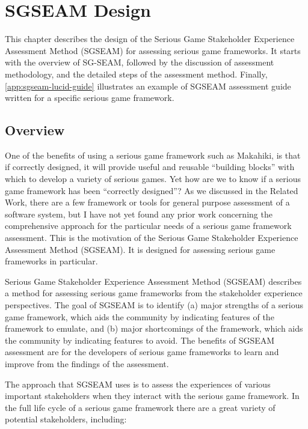 \chapter{SGSEAM Design}
\label{cha:sgseam-design}

This chapter describes the design of the Serious Game Stakeholder Experience 
Assessment Method (SGSEAM) for assessing serious game frameworks. It starts with the overview of SG-SEAM, followed by the discussion of assessment methodology, and the detailed steps of the assessment method. Finally, \autoref {app:sgseam-lucid-guide} illustrates an example of SGSEAM assessment guide written for a specific serious game framework.

\section{Overview}

One of the benefits of using a serious game framework such as Makahiki, is that if correctly designed, it will provide useful and reusable ``building blocks'' with which to develop a variety of serious games. Yet how are we to know if a serious game framework has been ``correctly designed''? As we discussed in the Related Work, there are a few  framework or tools for general purpose assessment of a software system, but I have not yet found any prior work concerning the comprehensive approach for the particular needs of a serious game framework assessment. This is the motivation of the Serious Game Stakeholder Experience 
Assessment Method (SGSEAM). It is designed for assessing serious game frameworks in particular.

Serious Game Stakeholder Experience Assessment Method (SGSEAM) describes a method for 
assessing serious game frameworks from the stakeholder 
experience perspectives.  The goal of SGSEAM is to identify (a) major strengths of a serious game
framework, which aids the community by indicating features of the framework to emulate, and
(b) major shortcomings of the framework, which aids the community by indicating features to avoid.
The benefits of SGSEAM assessment are for the developers of serious game frameworks 
to learn and improve from the findings of the assessment.

The approach that SGSEAM uses is to assess the experiences of various important stakeholders when
they interact with the serious game framework. In the full life cycle of a serious game framework
there are a great variety of potential stakeholders, including:

